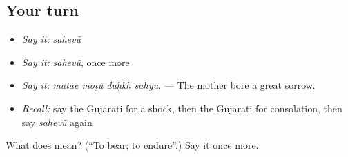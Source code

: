 \subsection*{Your turn}
\begin{itemize}
\raggedright
  \item \emph{Say it:} \emph{sahevũ}
  \item \emph{Say it:} \emph{sahevũ}, once more
  \item \emph{Say it:} \emph{mātāe moṭũ duḥkh sahyũ.} — The mother bore a great sorrow.
  \item \emph{Recall:} say the Gujarati for a shock, then the Gujarati for consolation, then say \emph{sahevũ} again
\end{itemize}

\begin{tcolorbox}[breakable,colback=teal!4,colframe=teal!35!black,title={Before you move on}]
What does  mean? (\textquotedblleft{}To bear; to endure\textquotedblright{}.) Say it once more.
\end{tcolorbox}
